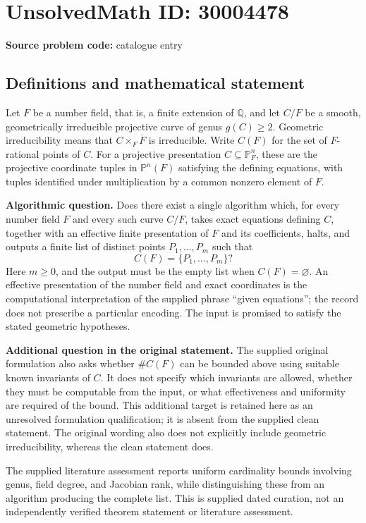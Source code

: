 \documentclass[11pt]{article}
\newcommand{\Q}{\mathbb{Q}}
\newcommand{\PP}{\mathbb{P}}
\begin{document}
\section*{UnsolvedMath ID: 30004478}
\textbf{Source problem code:} catalogue entry
\subsection{Definitions and mathematical statement}
Let \(F\) be a number field, that is, a finite extension of \(\Q\), and let \(C/F\) be a smooth, geometrically irreducible projective curve of genus \(g(C)\geq 2\). Geometric irreducibility means that \(C\times_F\overline F\) is irreducible. Write \(C(F)\) for the set of \(F\)-rational points of \(C\). For a projective presentation \(C\subseteq\PP_F^n\), these are the projective coordinate tuples in \(\PP^n(F)\) satisfying the defining equations, with tuples identified under multiplication by a common nonzero element of \(F\).

\textbf{Algorithmic question.} Does there exist a single algorithm which, for every number field \(F\) and every such curve \(C/F\), takes exact equations defining \(C\), together with an effective finite presentation of \(F\) and its coefficients, halts, and outputs a finite list of distinct points \(P_1,\ldots,P_m\) such that
\[
C(F)=\{P_1,\ldots,P_m\}?
\]
Here \(m\geq 0\), and the output must be the empty list when \(C(F)=\varnothing\). An effective presentation of the number field and exact coordinates is the computational interpretation of the supplied phrase ``given equations''; the record does not prescribe a particular encoding. The input is promised to satisfy the stated geometric hypotheses.

\textbf{Additional question in the original statement.} The supplied original formulation also asks whether \(\#C(F)\) can be bounded above using suitable known invariants of \(C\). It does not specify which invariants are allowed, whether they must be computable from the input, or what effectiveness and uniformity are required of the bound. This additional target is retained here as an unresolved formulation qualification; it is absent from the supplied clean statement. The original wording also does not explicitly include geometric irreducibility, whereas the clean statement does.

The supplied literature assessment reports uniform cardinality bounds involving genus, field degree, and Jacobian rank, while distinguishing these from an algorithm producing the complete list. This is supplied dated curation, not an independently verified theorem statement or literature assessment.
\end{document}

